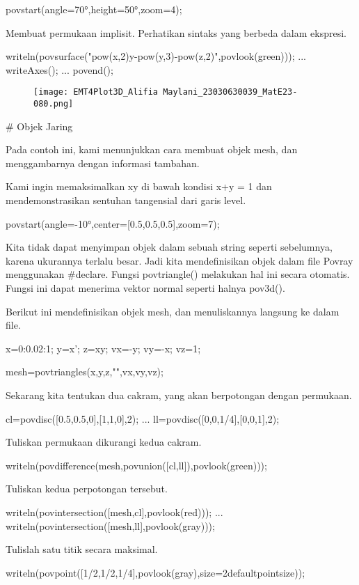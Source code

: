 \documentclass{article}
\begin{document}
\>povstart(angle=70°,height=50°,zoom=4);


Membuat permukaan implisit. Perhatikan sintaks yang berbeda dalam
ekspresi.


\>writeln(povsurface("pow(x,2)\*y-pow(y,3)-pow(z,2)",povlook(green))); ...  
\>   writeAxes(); ...  
\>   povend();


\begin{figure}
    \centering
    \texttt{[image: EMT4Plot3D\_Alifia Maylani\_23030630039\_MatE23-080.png]}
    \caption{}
    \label{fig:enter-label}
\end{figure}

# Objek Jaring

Pada contoh ini, kami menunjukkan cara membuat objek mesh, dan
menggambarnya dengan informasi tambahan.


Kami ingin memaksimalkan xy di bawah kondisi x+y = 1 dan
mendemonstrasikan sentuhan tangensial dari garis level.


\>povstart(angle=-10°,center=[0.5,0.5,0.5],zoom=7);


Kita tidak dapat menyimpan objek dalam sebuah string seperti
sebelumnya, karena ukurannya terlalu besar. Jadi kita mendefinisikan
objek dalam file Povray menggunakan #declare. Fungsi povtriangle()
melakukan hal ini secara otomatis. Fungsi ini dapat menerima vektor
normal seperti halnya pov3d().


Berikut ini mendefinisikan objek mesh, dan menuliskannya langsung ke
dalam file.


\>x=0:0.02:1; y=x'; z=x\*y; vx=-y; vy=-x; vz=1;

\>mesh=povtriangles(x,y,z,"",vx,vy,vz);


Sekarang kita tentukan dua cakram, yang akan berpotongan dengan
permukaan.


\>cl=povdisc([0.5,0.5,0],[1,1,0],2); ...  
\>   ll=povdisc([0,0,1/4],[0,0,1],2);


Tuliskan permukaan dikurangi kedua cakram.


\>writeln(povdifference(mesh,povunion([cl,ll]),povlook(green)));


Tuliskan kedua perpotongan tersebut.


\>writeln(povintersection([mesh,cl],povlook(red))); ...  
\>   writeln(povintersection([mesh,ll],povlook(gray)));


Tulislah satu titik secara maksimal.


\>writeln(povpoint([1/2,1/2,1/4],povlook(gray),size=2\*defaultpointsize));
\end{document}
